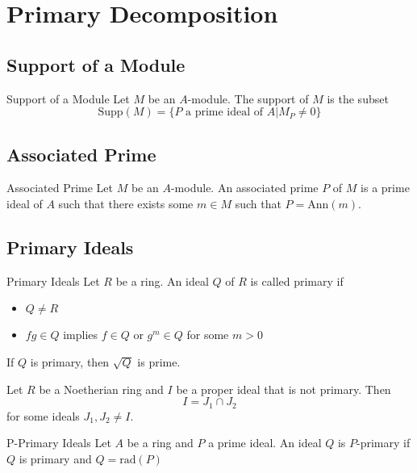 \documentclass[a4paper]{article}
\begin{document}
\pagebreak
\section{Primary Decomposition}
\subsection{Support of a Module}
\begin{defn}{Support of a Module}{} Let $M$ be an $A$-module. The support of $M$ is the subset $$\text{Supp}(M)=\{P\text{ a prime ideal of }A|M_P\neq 0\}$$
\end{defn}

\subsection{Associated Prime}
\begin{defn}{Associated Prime}{} Let $M$ be an $A$-module. An associated prime $P$ of $M$ is a prime ideal of $A$ such that there exists some $m\in M$ such that $P=\text{Ann}(m)$. 
\end{defn}

\subsection{Primary Ideals}
\begin{defn}{Primary Ideals}{} Let $R$ be a ring. An ideal $Q$ of $R$ is called primary if
\begin{itemize}
\item $Q\neq R$
\item $fg\in Q$ implies $f\in Q$ or $g^m\in Q$ for some $m>0$
\end{itemize}
\end{defn}

\begin{lmm}{}{} If $Q$ is primary, then $\sqrt{Q}$ is prime. 
\end{lmm}

\begin{lmm}{}{} Let $R$ be a Noetherian ring and $I$ be a proper ideal that is not primary. Then $$I=J_1\cap J_2$$ for some ideals $J_1,J_2\neq I$. 
\end{lmm}

\begin{defn}{P-Primary Ideals}{} Let $A$ be a ring and $P$ a prime ideal. An ideal $Q$ is $P$-primary if $Q$ is primary and $Q=\text{rad}(P)$
\end{defn}
\end{document}
